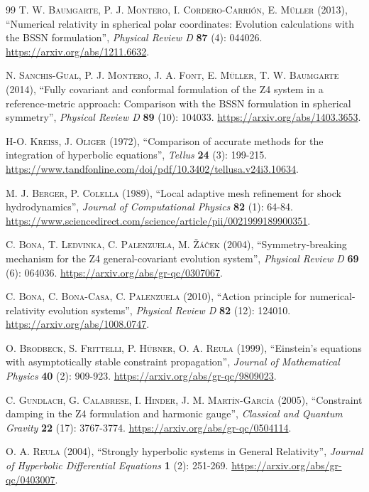 \documentclass{article}
\begin{document}
\begin{thebibliography}{99}
\textsc{T. W. Baumgarte, P. J. Montero, I. Cordero-Carri\'on, E. M\"uller} (2013), ``Numerical relativity in spherical polar coordinates: Evolution calculations with the BSSN formulation'', \textit{Physical Review D} \textbf{87} (4): 044026. \url{https://arxiv.org/abs/1211.6632}.

\textsc{N. Sanchis-Gual, P. J. Montero, J. A. Font, E. M\"uller, T. W. Baumgarte} (2014), ``Fully covariant and conformal formulation of the Z4 system in a reference-metric approach: Comparison with the BSSN formulation in spherical symmetry'', \textit{Physical Review D} \textbf{89} (10): 104033. \url{https://arxiv.org/abs/1403.3653}.

\textsc{H-O. Kreiss, J. Oliger} (1972), ``Comparison of accurate methods for the integration of hyperbolic equations'', \textit{Tellus} \textbf{24} (3): 199-215. \url{https://www.tandfonline.com/doi/pdf/10.3402/tellusa.v24i3.10634}.

\textsc{M. J. Berger, P. Colella} (1989), ``Local adaptive mesh refinement for shock hydrodynamics'', \textit{Journal of Computational Physics} \textbf{82} (1): 64-84. \url{https://www.sciencedirect.com/science/article/pii/0021999189900351}.

\textsc{C. Bona, T. Ledvinka, C. Palenzuela, M. \v{Z}\'a\v{c}ek} (2004), ``Symmetry-breaking mechanism for the Z4 general-covariant evolution system'', \textit{Physical Review D} \textbf{69} (6): 064036. \url{https://arxiv.org/abs/gr-qc/0307067}.

\textsc{C. Bona, C. Bona-Casa, C. Palenzuela} (2010), ``Action principle for numerical-relativity evolution systems'', \textit{Physical Review D} \textbf{82} (12): 124010. \url{https://arxiv.org/abs/1008.0747}.

\textsc{O. Brodbeck, S. Frittelli, P. H\"ubner, O. A. Reula} (1999), ``Einstein's equations with asymptotically stable constraint propagation'', \textit{Journal of Mathematical Physics} \textbf{40} (2): 909-923. \url{https://arxiv.org/abs/gr-qc/9809023}.

\textsc{C. Gundlach, G. Calabrese, I. Hinder, J. M. Mart\'in-Garc\'ia} (2005), ``Constraint damping in the Z4 formulation and harmonic gauge'', \textit{Classical and Quantum Gravity} \textbf{22} (17): 3767-3774. \url{https://arxiv.org/abs/gr-qc/0504114}.

\textsc{O. A. Reula} (2004), ``Strongly hyperbolic systems in General Relativity'', \textit{Journal of Hyperbolic Differential Equations} \textbf{1} (2): 251-269. \url{https://arxiv.org/abs/gr-qc/0403007}.


\end{thebibliography}
\end{document}
